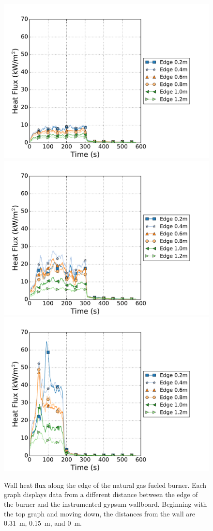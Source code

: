 \documentclass[twoside]{uocthesis}
\begin{document}
 \begin{figure}[p]
 	\centering
 	\includegraphics[width=.625\columnwidth]{../Figures/IWGBNG01_HF_Offset_Avg}\\
 	\includegraphics[width=.625\columnwidth]{../Figures/IWGBNG04_HF_Offset_Avg}\\
 	\includegraphics[width=.625\columnwidth]{../Figures/IWGBNG05_HF_Offset_Avg}\\
 	\caption[Wall heat flux along the edge of the natural gas fueled burner]{Wall heat flux along the edge of the natural gas fueled burner. Each graph displays data from a different distance between the edge of the burner and the instrumented gypsum wallboard.  Beginning with the top graph and moving down, the distances from the wall are 0.31~m, 0.15~m, and 0~m.}
 	\label{IWGB_NG_HF_EdgeSet}
 \end{figure}
\end{document}
